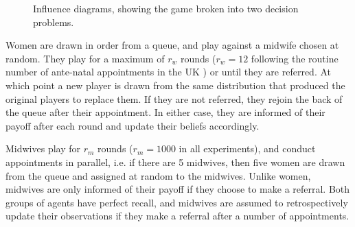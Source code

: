 \begin{figure}[H]
\begin{adjustbox}{center}\end{adjustbox}
\caption{Influence diagrams, showing the game broken into two decision problems.}

\label{fig:decision_problems}
\end{figure}

Women are drawn in order from a queue, and play against a midwife chosen at random. They play for a maximum of \(r_{w}\) rounds (\(r_{w}=12\) following the routine number of ante-natal appointments in the UK \citep{NICE2010a}) or until they are referred. At which point a new player is drawn from the same distribution that produced the original players to replace them. If they are not referred, they rejoin the back of the queue after their appointment. In either case, they are informed of their payoff after each round and update their beliefs accordingly.

Midwives play for \(r_{m}\) rounds (\(r_{m}=1000\) in all experiments), and conduct appointments in parallel, i.e. if there are 5 midwives, then five women are drawn from the queue and assigned at random to the midwives. 
Unlike women, midwives are only informed of their payoff if they choose to make a referral. Both groups of agents have perfect recall, and midwives are assumed to retrospectively update their observations if they make a referral after a number of appointments.


